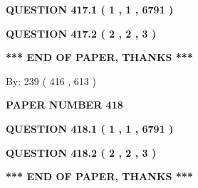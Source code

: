\documentclass[12pt]{article}
\begin{document}
 
   
   
  
\vspace{0.2in}
  
{\textbf{\Large{QUESTION
417.1 
 ( 1 , 1 , 6791 )
}}}
  
  
  
\vspace{0.2in}
  
{\textbf{\Large{QUESTION
417.2 
 ( 2 , 2 , 3 )
}}}
  
  
   
   
 \vspace{0.2in}
 
   
   
   
   
\vspace{1.0in} 
{\textbf{\large{ *** END OF PAPER, THANKS *** }}} 
   
   
\hspace{1.0in} By: 
 239 ( 416 ,  613 )
   
   
   
   
\newpage 
\setcounter{page}{ 
   418001 } 
   
   
   
   
 {\textbf{ \Large{ PAPER NUMBER  418  }}}
   
   
\vspace{0.2in}
   
   
   
   
   
   
 \vspace{0.2in}
 
 
 
 
   
   
  
\vspace{0.2in}
  
{\textbf{\Large{QUESTION
418.1 
 ( 1 , 1 , 6791 )
}}}
  
  
  
\vspace{0.2in}
  
{\textbf{\Large{QUESTION
418.2 
 ( 2 , 2 , 3 )
}}}
  
  
   
   
 \vspace{0.2in}
 
   
   
   
   
\vspace{1.0in} 
{\textbf{\large{ *** END OF PAPER, THANKS *** }}} 
   
\end{document}
